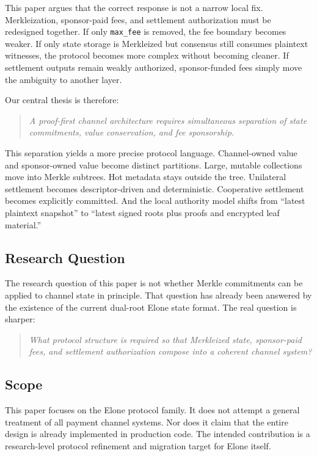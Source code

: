 \documentclass[11pt,a4paper]{article}
\newcommand{\code}[1]{\texttt{#1}}
\begin{document}
This paper argues that the correct response is not a narrow local fix. Merkleization, sponsor-paid fees, and settlement authorization must be redesigned together. If only \code{max\_fee} is removed, the fee boundary becomes weaker. If only state storage is Merkleized but consensus still consumes plaintext witnesses, the protocol becomes more complex without becoming cleaner. If settlement outputs remain weakly authorized, sponsor-funded fees simply move the ambiguity to another layer.

Our central thesis is therefore:

\begin{quote}
\textit{A proof-first channel architecture requires simultaneous separation of state commitments, value conservation, and fee sponsorship.}
\end{quote}

This separation yields a more precise protocol language. Channel-owned value and sponsor-owned value become distinct partitions. Large, mutable collections move into Merkle subtrees. Hot metadata stays outside the tree. Unilateral settlement becomes descriptor-driven and deterministic. Cooperative settlement becomes explicitly committed. And the local authority model shifts from ``latest plaintext snapshot'' to ``latest signed roots plus proofs and encrypted leaf material.''

\subsection{Research Question}

The research question of this paper is not whether Merkle commitments can be applied to channel state in principle. That question has already been answered by the existence of the current dual-root Elone state format. The real question is sharper:

\begin{quote}
\textit{What protocol structure is required so that Merkleized state, sponsor-paid fees, and settlement authorization compose into a coherent channel system?}
\end{quote}

\subsection{Scope}

This paper focuses on the Elone protocol family. It does not attempt a general treatment of all payment channel systems. Nor does it claim that the entire design is already implemented in production code. The intended contribution is a research-level protocol refinement and migration target for Elone itself.
\end{document}
